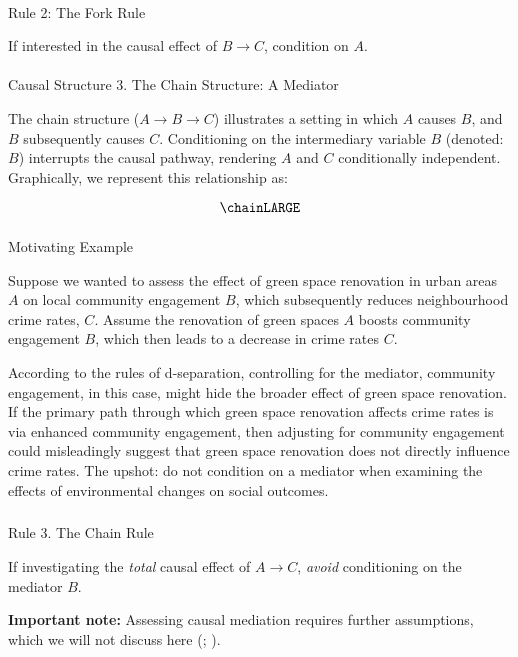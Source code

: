 \documentclass[
  singlecolumn]{article}
\makeatletter
\let\oldparagraph\paragraph
\renewcommand{\paragraph}{
    \@ifstar
      \xxxParagraphStar
      \xxxParagraphNoStar
  }
\newcommand{\xxxParagraphStar}[1]{\oldparagraph*{#1}\mbox{}}
\newcommand{\xxxParagraphNoStar}[1]{\oldparagraph{#1}\mbox{}}
\let\oldsubparagraph\subparagraph
\renewcommand{\subparagraph}{
    \@ifstar
      \xxxSubParagraphStar
      \xxxSubParagraphNoStar
  }
\newcommand{\xxxSubParagraphStar}[1]{\oldsubparagraph*{#1}\mbox{}}
\newcommand{\xxxSubParagraphNoStar}[1]{\oldsubparagraph{#1}\mbox{}}
\makeatother
\begin{document}
\paragraph{Rule 2: The Fork Rule}\label{sec-four-rules}

If interested in the causal effect of \(B \to C\), condition on
\(\boxed{A}\).

\paragraph{Causal Structure 3. The Chain Structure: A
Mediator}\label{causal-structure-3.-the-chain-structure-a-mediator}

The chain structure (\(A \rightarrow B \rightarrow C\)) illustrates a
setting in which \(A\) causes \(B\), and \(B\) subsequently causes
\(C\). Conditioning on the intermediary variable \(B\) (denoted:
\(\boxed{B}\)) interrupts the causal pathway, rendering \(A\) and \(C\)
conditionally independent. Graphically, we represent this relationship
as:

\[\chainLARGE\]

\subparagraph{Motivating Example}\label{motivating-example-2}

Suppose we wanted to assess the effect of green space renovation in
urban areas \(A\) on local community engagement \(B\), which
subsequently reduces neighbourhood crime rates, \(C\). Assume the
renovation of green spaces \(A\) boosts community engagement \(B\),
which then leads to a decrease in crime rates \(C\).

According to the rules of d-separation, controlling for the mediator,
community engagement, in this case, might hide the broader effect of
green space renovation. If the primary path through which green space
renovation affects crime rates is via enhanced community engagement,
then adjusting for community engagement could misleadingly suggest that
green space renovation does not directly influence crime rates. The
upshot: do not condition on a mediator when examining the effects of
environmental changes on social outcomes.

\subparagraph{Rule 3. The Chain Rule}\label{rule-3.-the-chain-rule}

If investigating the \emph{total} causal effect of \(A\to C\),
\emph{avoid} conditioning on the mediator \(B\).

\textbf{Important note:} Assessing causal mediation requires further
assumptions, which we will not discuss here
(;
).
\end{document}
